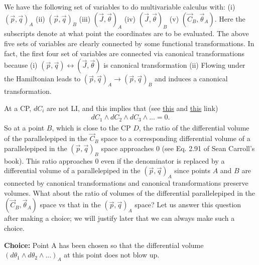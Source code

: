 \documentclass[prd,floatfix,nofootinbib,longbibliography,notitlepage,superscriptaddress]{revtex4-1}
\begin{document}
We have the following set of variables to do
multivariable  calculus with: (i) $(\vec{p}, \vec{q})_A$
(ii) $(\vec{p}, \vec{q})_B$
(iii) $(\vec{J}, \vec{\theta})_A$
(iv) $(\vec{J}, \vec{\theta})_B$
(v) $(\vec{C}_B, \vec{\theta}_A)$.
Here the subscripts denote at what point the
coordinates are to be evaluated.
The above five sets of variables are
clearly connected by some functional transformations.
In fact, the first four set of variables are connected via 
canonical transformations because
(i) $(\vec{p}, \vec{q})  \leftrightarrow (\vec{J}, \vec{\theta}) $ 
is canonical transformation
(ii) Flowing under the Hamiltonian leads to
$(\vec{p}, \vec{q})_A  \rightarrow (\vec{p}, \vec{q})_B $
and induces a canonical transformation.






At a CP, 
$dC_i$ are not LI, and this implies that
(see \href{https://math.stackexchange.com/questions/3603283/differential-1-forms-and-linear-independence}{this} 
and 
\href{https://math.stackexchange.com/questions/95167/covectors-omega1-omegak-are-linearly-dependent-iff-their-wedge-produ}{this} link)
\begin{align}
dC_1 \wedge dC_2 \wedge dC_3 \wedge... = 0   .     \label{1}
\end{align}
So at a point $B$, which is close to the CP $D$,
 the ratio of the  differential volume of the parallelepiped
 in the $\vec{C}_B$ space
to a corresponding differential volume 
of a parallelepiped in the $(\vec{p}, \vec{q})_B$ space approaches 0 
(see Eq. 2.91 of Sean Carroll's book).
This ratio approaches 0 even if the denominator is replaced by
 a differential volume 
of a parallelepiped in the $(\vec{p}, \vec{q})_A$ since points
$A$ and $B$ are connected by canonical transformations and
canonical transformations preserve volumes.
What about the ratio of volumes of 
the differential parallelepiped in the 
$(\vec{C}_B, \vec{\theta}_A)$ space vs that in the
$(\vec{p}, \vec{q})_A$ space?
Let us answer this question after making a choice;
we will justify later that we can always make such a choice.




\textbf{Choice:}
Point A has been chosen so that
the differential volume
$(d \theta_1 \wedge d\theta_2 \wedge...)_A$ at this point does not
blow up.
\end{document}
